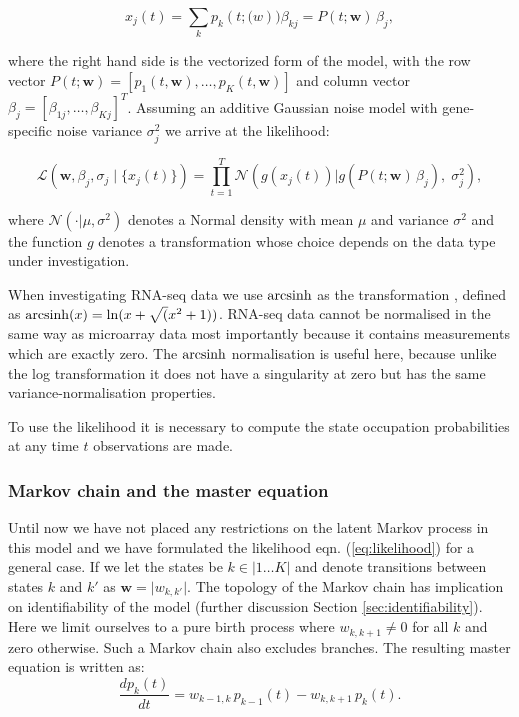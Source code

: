 \begin{equation}
  x_j(t) = \sum_k p_k(t;\mathbf(w))\beta_{kj} = P(t;\mathbf{w}) \, \beta_j,
  \label{eq:model}
\end{equation}

where the right hand side is the vectorized form of the model, with the row vector $P(t;\mathbf{w}) = [p_1(t,\mathbf{w}), \ldots , p_K(t,\mathbf{w})]$ and column vector $\beta_j = [\beta_{1j}, \ldots , \beta_{Kj}]^T$. Assuming an additive Gaussian noise model with gene-specific noise variance $\sigma_j^2 $ we arrive at the likelihood:

\begin{equation}
  \label{eq:likelihood}
    \mathcal{L} \left(\mathbf{w}, \beta_j, \sigma_j \;|\; \lbrace x_j(t)\rbrace\right) = 
\prod_{t=1}^T \mathcal{N}\left(g(x_j(t)) | g\left(P(t; \mathbf{w})\,\beta_j\right),\; \sigma_j^2 \right),
\end{equation}

where $\mathcal{N}(\cdot | \mu,\sigma^2)$ denotes a Normal density with mean $\mu$ and variance $\sigma^2$ and the function $g$ denotes a transformation whose choice depends on the data type under investigation.


When investigating RNA-seq data we use $\operatorname{arcsinh}$ as the transformation \citep{Hoffman:2012gn,Johnson:1949uq}, defined as $\operatorname{arcsinh}(x) = \ln(x + \sqrt(x^2 +1))$. RNA-seq data cannot be normalised in the same way as microarray data most importantly because it contains measurements which are exactly zero. The $\operatorname{arcsinh}$ normalisation is useful here, because unlike the log transformation it does not have a singularity at zero but has the same variance-normalisation properties.

To use the likelihood it is necessary to compute the state occupation probabilities at any time $t$ observations are made.

\subsubsection{Markov chain and the master equation}
\label{sec:markov-chain-master}

Until now we have not placed any restrictions on the latent Markov process in this model and we have formulated the
likelihood eqn. (\ref{eq:likelihood}) for a general case. If we let the states be $k \in \lvert 1 \ldots K \rvert$ and denote transitions between states $k$ and $k'$ as $\mathbf{w} = \lvert w_{k,k'} \rvert$. 
The topology of the Markov chain has implication on identifiability of the model (further discussion Section \ref{sec:identifiability}). Here we limit ourselves to a pure birth process where $w_{k,k+1} \ne 0$ for all $k$ and zero otherwise. Such a Markov chain also excludes branches. The resulting master equation is written as:
\begin{equation}
  \label{eq:master}
  \frac{d p_k(t)}{dt} = w_{k-1,k}\, p_{k-1}(t) - w_{k,k+1}\, p_k(t).
\end{equation}

